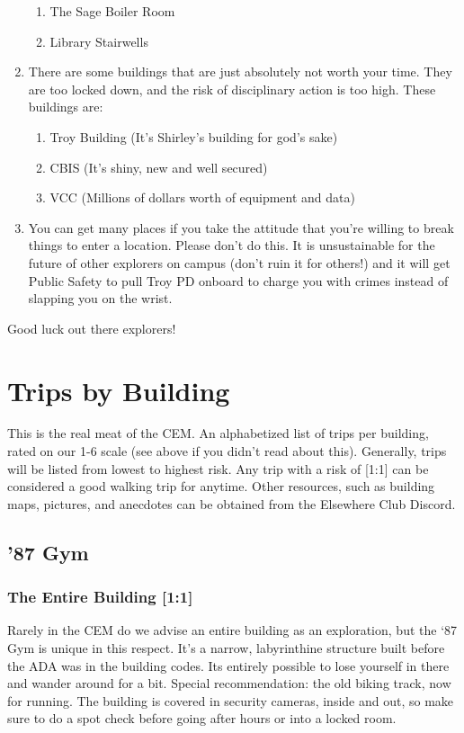 \documentclass{article}
\begin{document}
\begin{enumerate}
\begin{enumerate}
    \item The Sage Boiler Room
    \item Library Stairwells
  \end{enumerate}
\item There are some buildings that are just absolutely not worth your time. They are too locked down, and the risk of disciplinary action is too high. These buildings are:
  \begin{enumerate}
    \item Troy Building (It’s Shirley’s building for god’s sake)
    \item CBIS (It’s shiny, new and well secured)
    \item VCC (Millions of dollars worth of equipment and data)
  \end{enumerate}
\item You can get many places if you take the attitude that you’re willing to break things to enter a location. Please don’t do this. It is unsustainable for the future of other explorers on campus (don’t ruin it for others!) and it will get Public Safety to pull Troy PD onboard to charge you with crimes instead of slapping you on the wrist.
\end{enumerate}
Good luck out there explorers!

\section{Trips by Building}
This is the real meat of the CEM. An alphabetized list of trips per building, rated on our 1-6 scale (see above if you didn’t read about this). Generally, trips will be listed from lowest to highest risk. Any trip with a risk of [1:1] can be considered a good walking trip for anytime. Other resources, such as building maps, pictures, and anecdotes can be obtained from the Elsewhere Club Discord.



\pagebreak
\subsection{'87 Gym}
\subsubsection{The Entire Building [1:1]}
Rarely in the CEM do we advise an entire building as an exploration, but the ‘87 Gym is unique in this respect. It’s a narrow, labyrinthine structure built before the ADA was in the building codes. Its entirely possible to lose yourself in there and wander around for a bit. Special recommendation: the old biking track, now for running. The building is covered in security cameras, inside and out, so make sure to do a spot check before going after hours or into a locked room.
\end{document}
